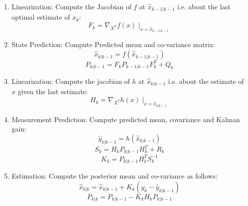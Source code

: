 \documentclass[a4paper,11pt]{article}
\theoremstyle{mytheor}
\begin{document}
\begin{enumerate}
    \item 
    Linearization: Compute the Jacobian of $f$ at $\hat{x}_{k-1|k-1}$ i.e. about the last optimal estimate of $x_k$:
    \begin{equation*}
        F_k = \nabla_{X^T} f(x) \mid_{x = \hat{x}_{k-1|k-1}}
    \end{equation*}
    
    \item 
    State Prediction: Compute Predicted mean and co-variance matrix: 
    \begin{equation*}
        \hat{x}_{k|k-1} = f(\hat{x}_{k-1|k-1})
    \end{equation*}
    \begin{equation*}
        P_{k|k-1} = F_k P_{k-1|k-1} F_k^T + Q_k
    \end{equation*}
    
    \item 
    Linearization: Compute the jacobian of $h$ at $\hat{x}_{k|k-1}$ i.e. about the estimate of $x$ given the last estimate: 
    \begin{equation*}
        H_k = \nabla_{X^T} h(x) \mid_{x = \hat{x}_{k|k-1}}
    \end{equation*}
    
    \item 
    Measurement Prediction: Compute predicted mean, covariance and Kalman gain: 
    \begin{equation*}
        \hat{y}_{k|k-1}  = h(\hat{x}_{k|k-1})
    \end{equation*}
    \begin{equation*}
        S_k = H_k P_{k|k-1} H_k^T + R_k 
    \end{equation*}
    \begin{equation*}
        K_k = P_{k|k-1} H_k^T S_k^{-1}
    \end{equation*}
    
    \item
    Estimation: Compute the posterior mean and co-variance as follows: 
    \begin{equation*}
        \hat{x}_{k|k} = \hat{x}_{k|k-1} + K_k(y_k - \hat{y}_{k|k-1})
    \end{equation*}
    \begin{equation*}
        P_{k|k} = P_{k|k-1} - K_k H_k P_{k|k-1}
    \end{equation*}
\end{enumerate}
\end{document}
